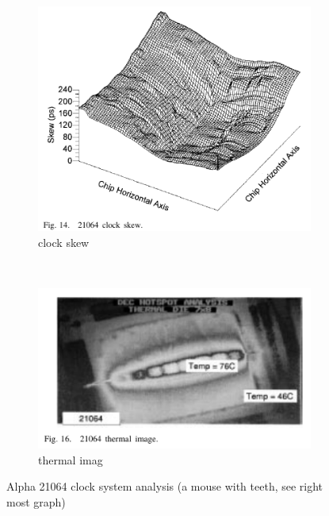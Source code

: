 \documentclass[11pt]{article}
\newcommand{\note}[1]{\scriptsize{#1}\normalsize}
\begin{document}
\begin{figure}[h]
\begin{subfigure}[b]{0.3\textwidth}
		\includegraphics[width=\textwidth]{21064_2.png}
		\caption{clock skew}
	\end{subfigure}
	~ %
	\begin{subfigure}[b]{0.3\textwidth}
		\includegraphics[width=\textwidth]{21064_3.png}
		\caption{thermal imag}
	\end{subfigure}
	\caption{Alpha 21064 clock system analysis (\note{a mouse with teeth, see right most graph})}
\end{figure}
\end{document}
